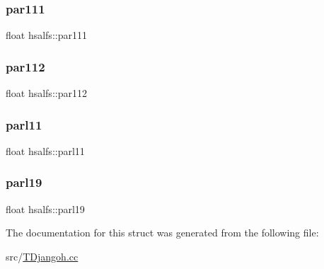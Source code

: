 \subsubsection{\texorpdfstring{par111}{par111}}
{\footnotesize\ttfamily float hsalfs\+::par111}

\mbox{\label{structhsalfs_aaa5a9ec0228550ed2b1f4ae093eb1bac}} 
\subsubsection{\texorpdfstring{par112}{par112}}
{\footnotesize\ttfamily float hsalfs\+::par112}

\mbox{\label{structhsalfs_a6bee8c9ef5c16bee30a8e5af4f3afe92}} 
\subsubsection{\texorpdfstring{parl11}{parl11}}
{\footnotesize\ttfamily float hsalfs\+::parl11}

\mbox{\label{structhsalfs_a0f6dcc0ffa11d6b26b7b756b111fdbfa}} 
\subsubsection{\texorpdfstring{parl19}{parl19}}
{\footnotesize\ttfamily float hsalfs\+::parl19}



The documentation for this struct was generated from the following file\+:\begin{DoxyCompactItemize}
\item 
src/\hyperlink{_t_djangoh_8cc}{T\+Djangoh.\+cc}\end{DoxyCompactItemize}
